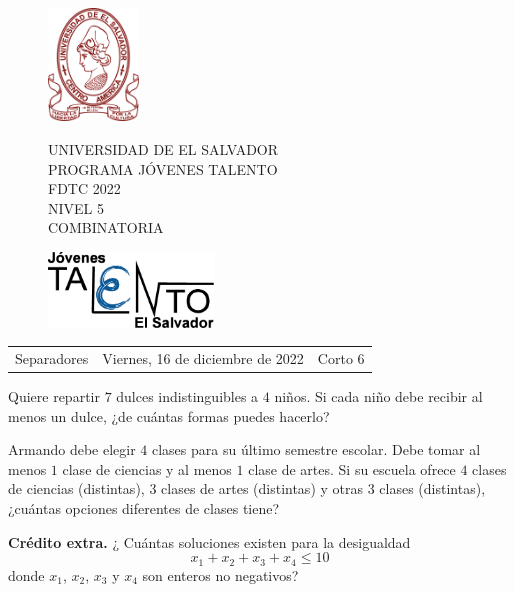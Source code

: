 \documentclass[12pt]{article}
\newcommand{\tema}{Separadores}
\newcommand{\fecha}{Viernes, 16 de diciembre de 2022}
\newcommand{\sesion}{Corto 6}
\begin{document}
\thispagestyle{empty}

\begin{figure}[h] 
	\begin{minipage}[b]{0.26\textwidth}
		\begin{center}
			\includegraphics[height=3cm]{Logos/UES.png}
			\par\end{center}
	\end{minipage} 
	\begin{minipage}[b]{0.46\textwidth}
		\begin{center}
			UNIVERSIDAD DE EL SALVADOR\\ [0.1cm]
			PROGRAMA JÓVENES TALENTO\\ [0.1cm]
	        FDTC 2022\\ [0.1cm]
                NIVEL 5\\ [0.1cm]
			COMBINATORIA 
			\par\end{center}
	\end{minipage} 
	\begin{minipage}[b]{0.05\textwidth}
		\begin{center}
			\includegraphics[height=2cm]{Logos/LOGO PJT.png}
			\par\end{center}
	\end{minipage}
\end{figure}

\begin{center}
    \begin{tabular}{p{4.5cm} p{7cm} p{4.5cm}}
        \tema & \centering\fecha & \hfill\sesion
    \end{tabular}
\end{center}

\begin{problema}
Quiere repartir $7$ dulces indistinguibles a $4$ niños. Si cada niño debe recibir al menos un dulce, ¿de cuántas formas puedes hacerlo?
\end{problema}

\begin{problema}
Armando debe elegir $4$ clases para su último semestre escolar. Debe tomar al menos $1$ clase de ciencias y al menos $1$ clase de artes. Si su escuela ofrece $4$ clases de ciencias (distintas), $3$ clases de artes (distintas) y otras $3$ clases (distintas), ¿cuántas opciones diferentes de clases tiene?
\end{problema}

\textbf{Crédito extra.} ¿ Cuántas soluciones existen para la desigualdad
\[x_1+x_2+x_3+x_4\leq 10\]
donde $x_1$, $x_2$, $x_3$ y $x_4$ son enteros no negativos?
\end{document}
